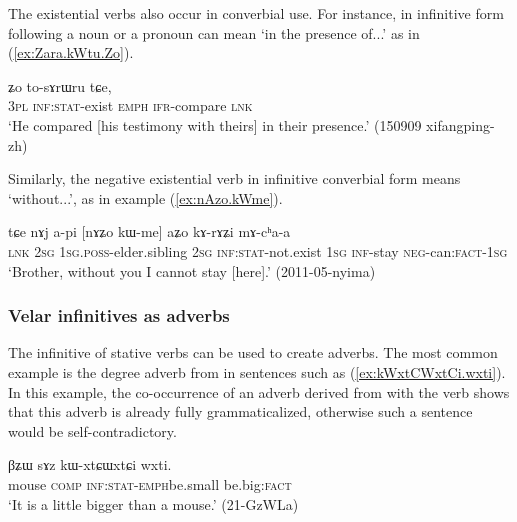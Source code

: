 The existential verbs also occur in converbial use. For instance,  in infinitive form  following a noun or a pronoun can mean `in the presence of...' as in (\ref{ex:Zara.kWtu.Zo}).

\begin{exe}
\ex \label{ex:Zara.kWtu.Zo}
\gll [ʑara kɯ-tu] ʑo to-sɤrɯru tɕe, \\
\textsc{3pl} \textsc{inf}:\textsc{stat}-exist \textsc{emph} \textsc{ifr}-compare \textsc{lnk} \\
\glt `He compared [his testimony with theirs] in their presence.' (150909 xifangping-zh) 
\end{exe}

Similarly, the negative existential verb  in infinitive converbial form means `without...', as in example  (\ref{ex:nAzo.kWme}).

\begin{exe}
\ex \label{ex:nAzo.kWme}
\gll tɕe nɤj a-pi [nɤʑo kɯ-me] aʑo kɤ-rɤʑi mɤ-cʰa-a \\
\textsc{lnk} \textsc{2sg} \textsc{1sg}.\textsc{poss}-elder.sibling \textsc{2sg} \textsc{inf}:\textsc{stat}-not.exist \textsc{1sg} \textsc{inf}-stay \textsc{neg}-can:\textsc{fact}-\textsc{1sg} \\
\glt `Brother, without you I cannot stay [here].' (2011-05-nyima)
\end{exe}

\subsubsection{Velar infinitives as adverbs}    \label{sec:velar.inf.adverb}
The  infinitive of stative verbs can be used to create adverbs. The most common example is the degree adverb   from  in sentences such as (\ref{ex:kWxtCWxtCi.wxti}). In this example, the co-occurrence of an adverb derived from  with the verb  shows that this adverb is already fully grammaticalized, otherwise such a sentence would be self-contradictory.

\begin{exe}
\ex \label{ex:kWxtCWxtCi.wxti}
 \gll βʑɯ sɤz kɯ-xtɕɯ\redp{}xtɕi wxti. \\
 mouse \textsc{comp} \textsc{inf}:\textsc{stat}-\textsc{emph}\redp{}be.small be.big:\textsc{fact} \\
 \glt `It is a little bigger than a mouse.' (21-GzWLa) 
\end{exe}

